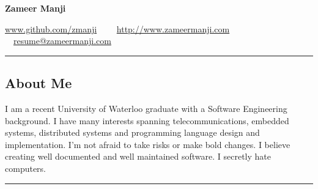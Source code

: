 \documentclass[10pt,letterpaper]{article}
\begin{document}
\begin{center}
{\huge \textbf{Zameer Manji}}


\href{http://www.github.com/zmanji/}{www.github.com/zmanji}\ \ \textbullet
\ \ \href{http://www.zameermanji.com}{http://www.zameermanji.com}\ \ \textbullet
\ \ \href{malto:resume@zameermanji.com}{resume@zameermanji.com}

\end{center}

\hrule
\vspace{-0.4em}
\subsection*{About Me}
I am a recent University of Waterloo graduate with a Software Engineering
background. I have many interests spanning telecommunications, embedded systems,
distributed systems and programming language design and implementation. I'm not
afraid to take risks or make bold changes. I believe creating well documented
and well maintained software.  I secretly hate computers.
\\

\hrule
\vspace{-0.4em}
\end{document}

